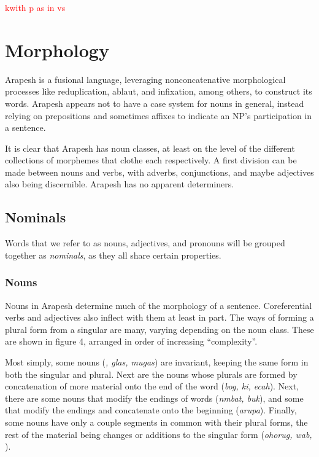 \documentclass[pdftex,12pt,letterpaper]{article}
\let\ipa\textipa
\def\sw{\ipa{\super w}}
\newcommand\nyi[1]{\textcolor{red}{#1}}
\begin{document}
\nyi{k\sw with p as in \ipa{@m@kep} vs \ipa{@m@kek\sw}}

\pagebreak
 \section{Morphology}

 Arapesh is a fusional language, leveraging nonconcatenative morphological processes like reduplication, ablaut, and infixation, among others, to construct its words. Arapesh appears not to have a case system for nouns in general, instead relying on prepositions and sometimes affixes to indicate an NP's participation in a sentence.

 It is clear that Arapesh has noun classes, at least on the level of the different collections of morphemes that clothe each respectively. A first division can be made between nouns and verbs, with adverbs, conjunctions, and maybe adjectives also being discernible. Arapesh has no apparent determiners. 


\subsection{Nominals}

Words that we refer to as nouns, adjectives, and pronouns will be grouped together as \emph{nominals}, as they all share certain properties.

 \subsubsection{Nouns}

 Nouns in Arapesh determine much of the morphology of a sentence. Coreferential verbs and adjectives also inflect with them at least in part. The ways of forming a plural form from a singular are many, varying depending on the noun class. These are shown in figure 4, arranged in order of increasing ``complexity''. 

 Most simply, some nouns (\emph{\ipa{\textltailn eg1r}, glas, mugas}) are invariant, keeping the same form in both the singular and plural. Next are the nouns whose plurals are formed by concatenation of more material onto the end of the word (\emph{bog, ki, ecah\sw}). Next, there are some nouns that modify the endings of words (\emph{n\ipa{1}mbat, buk}), and some that modify the endings and concatenate onto the beginning (\emph{arupa}). Finally, some nouns have only a couple segments in common with their plural forms, the rest of the material being changes or additions to the singular form (\emph{ohorug, wab, \ipa{y@rih}}).
\end{document}
